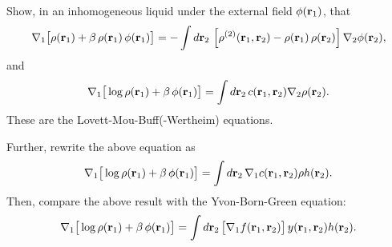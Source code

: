 \documentclass[12pt]{book}
\begin{document}
%
%




Show, in an inhomogeneous liquid under the external field $\phi(\vr_1)$, that
%
\begin{align*}
  \nabla_1 \big[
    \rho(\vr_1)
  + \beta \, \rho(\vr_1) \, \phi(\vr_1)
\big]
  =
  -\int d \vr_2 \,
    \left[
      \rho^{(2)}(\vr_1, \vr_2) - \rho(\vr_1) \, \rho(\vr_2)
    \right]
    \nabla_2 \phi(\vr_2),
\end{align*}
%
and
%
\begin{align}
  \nabla_1 \big[
    \log \rho(\vr_1) + \beta \, \phi(\vr_1)
  \big]
   = \int d \vr_2 \,
    c(\vr_1, \vr_2)
    \nabla_2 \rho(\vr_2).
\end{align}
These are the Lovett-Mou-Buff(-Wertheim) equations\cite{lovett1976, wertheim1976}.




Further, rewrite the above equation as
%
\[
   \nabla_1
   \big[
     \log \rho(\vr_1) + \beta \, \phi(\vr_1)
   \big]
  =
 \int d \vr_2 \,
    \nabla_1 c(\vr_1, \vr_2)
    \rho h(\vr_2).
\]
%
Then, compare the above result with the Yvon-Born-Green equation:
%
\begin{align}
   \nabla_1
   \big[
     \log \rho(\vr_1) + \beta \, \phi(\vr_1)
   \big]
  =
 \int d \vr_2 \,
    \big[ \nabla_1 f(\vr_1, \vr_2) \big]
    \, y(\vr_1, \vr_2)
    h(\vr_2).
\end{align}
\end{document}
